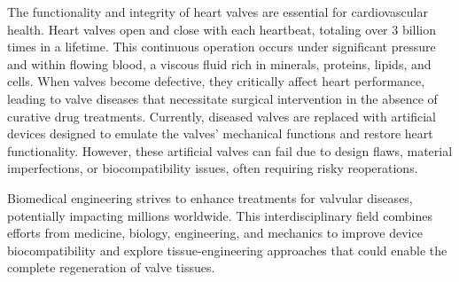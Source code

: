 The functionality and integrity of heart valves are essential for cardiovascular health. Heart valves open and close with each heartbeat, totaling over 3 billion times in a lifetime. This continuous operation occurs under significant pressure and within flowing blood, a viscous fluid rich in minerals, proteins, lipids, and cells. When valves become defective, they critically affect heart performance, leading to valve diseases that necessitate surgical intervention in the absence of curative drug treatments. Currently, diseased valves are replaced with artificial devices designed to emulate the valves' mechanical functions and restore heart functionality. However, these artificial valves can fail due to design flaws, material imperfections, or biocompatibility issues, often requiring risky reoperations. ~

Biomedical engineering strives to enhance treatments for valvular diseases, potentially impacting millions worldwide. This interdisciplinary field combines efforts from medicine, biology, engineering, and mechanics to improve device biocompatibility and explore tissue-engineering approaches that could enable the complete regeneration of valve tissues. ~


